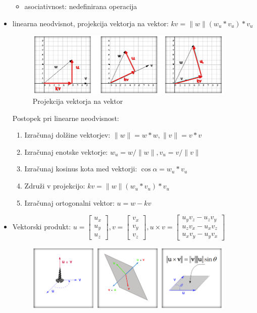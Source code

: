 \documentclass{article}
\begin{document}
\begin{itemize}
\begin{itemize}
    \item asociativnost: nedefinirana operacija
\end{itemize}
\item linearna neodvisnot, projekcija vektorja na vektor: $kv = \lVert w \rVert (w_u * v_u)*v_u$
\begin{figure}[H]
\centering
\includegraphics[width=100mm]{src/projekcija_vektorja_na_vektor.png}
\caption{Projekcija vektorja na vektor}
\end{figure}
Postopek pri linearne neodvisnost:
\begin{enumerate}
    \item Izračunaj dolžine vektorjev: $\lVert w \rVert = w * w, \lVert v \rVert = v * v$ 
    \item Izračunaj enotske vektorje: $w_u = w/ \lVert w \rVert, v_u = v/ \lVert v \rVert$
    \item Izračunaj kosinus kota med vektorji: $\cos{\alpha} = w_u * v_u$
    \item Združi v projekcijo: $kv = \lVert w \rVert (w_u * v_u)*v_u$
    \item Izračunaj ortogonalni vektor: $u = w - kv$
\end{enumerate}
\item Vektorski produkt: $u = \begin{bmatrix} u_x \\ u_y \\ u_z \end{bmatrix}, v = \begin{bmatrix} v_x \\ v_y \\ v_z \end{bmatrix}, u \times v = \begin{bmatrix} u_yv_z - u_zv_y \\ u_zv_x - u_xv_z \\ u_xv_y - u_yv_x \end{bmatrix}$
\begin{figure}[H]
\centering
\includegraphics[width=100mm]{src/vektorski_produkt.png}

\end{figure}
\end{itemize}
\end{document}
